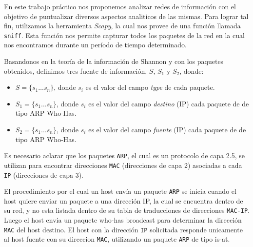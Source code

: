 En este trabajo práctico nos proponemos analizar redes de información con el objetivo de puntualizar diversos aspectos analiticos de las mismas. Para lograr tal fin, utilizamos la herramienta \textit{Scapy}, la cual nos provee de una función llamada \texttt{sniff}. Esta función nos permite capturar todos los paquetes de la red en la cual nos encontramos durante un período de tiempo determinado.

Basandonos en la teoría de la información de Shannon y con los paquetes obtenidos, definimos tres fuente de información, $S$, $S_{1}$ y $S_{2}$, donde:

\begin{itemize}
  \item $S = \{s_{1} \dots s_{n}\}$, donde $s_{i}$ es el valor del campo \emph{type} de cada paquete.
  \item $S_{1} = \{s_{1} \dots s_{n}\} $, donde $s_i$ es el valor del campo \emph{destino} (IP) cada paquete de
  de tipo ARP Who-Has.
  \item $S_{2} = \{s_{1} \dots s_{n}\} $, donde $s_i$ es el valor del campo \emph{fuente} (IP) cada paquete de
  de tipo ARP Who-Has.
\end{itemize}

Es necesario aclarar que los paquetes \texttt{ARP}, el cual es un protocolo de capa 2.5, se utilizan para encontrar direcciones \texttt{MAC} (direcciones de capa 2) asociadas a cada \texttt{IP} (direcciones de capa 3).

El procedimiento por el cual un host envía un paquete \texttt{ARP} se inicia cuando el host quiere enviar un paquete a una dirección IP, la cual se encuentra dentro de su red, y no esta listada dentro de su tabla de traducciones de direcciones \texttt{MAC-IP}. Luego el host envía un paquete who-has broadcast para determinar la dirección \texttt{MAC} del host destino. El host con la dirección \texttt{IP} solicitada responde unicamente al host fuente con su direccion \texttt{MAC}, utilizando un paquete \texttt{ARP} de tipo is-at.
